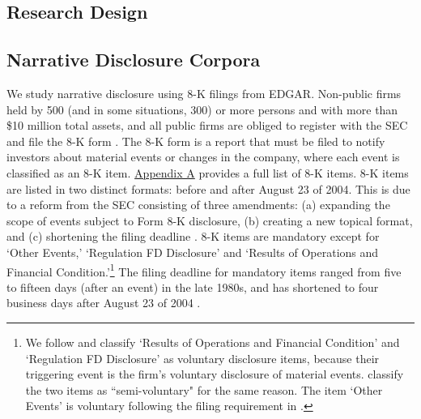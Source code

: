 \documentclass[letterpaper,12pt]{article}
\begin{document}
\begin{spacing}{1.5}
\begin{comment}
Aligned with the prior literature on the usefulness of conservatism, we argue that more complete, news-consistent and timely disclosure of bad news relative to good news enhances contract efficiency [specific hypotheses to be developed]. However, we do not make claims about the valuation role of narrative conservatism.

\end{comment}

\section{Research Design}
\subsection{Narrative Disclosure Corpora} \label{sec3.1}
We study narrative disclosure using 8-K filings from EDGAR. Non-public firms held by 500 (and in some situations, 300) or more persons and with more than \$10 million total assets, and all public firms are obliged to register with the SEC and file the 8-K form \cite{segalAreManagersStrategic2016}. The 8-K form is a report that must be filed to notify investors about material events or changes in the company, where each event is classified as an 8-K item. \hyperref[appa]{Appendix A} provides a full list of 8-K items. 8-K items are listed in two distinct formats: before and after August 23 of 2004. This is due to a reform from the SEC consisting of three amendments: (a) expanding the scope of events subject to Form 8-K disclosure, (b) creating a new topical format, and (c) shortening the filing deadline \cite{secFinalRuleAdditional2004, lermanNewForm8K2010}. 8-K items are mandatory except for `Other Events,'  `Regulation FD Disclosure' and `Results of Operations and Financial Condition.'\footnote{We follow  and classify `Results of Operations and Financial Condition' and `Regulation FD Disclosure' as voluntary disclosure items, because their triggering event is the firm's voluntary disclosure of material events.  classify the two items as ``semi-voluntary" for the same reason. The item `Other Events' is voluntary following the filing requirement in . } The filing deadline for mandatory items ranged from five to fifteen days (after an event) in the late 1980s, and has shortened to four business days after August 23 of 2004 \cite{lermanNewForm8K2010}.


\end{spacing}
\end{document}
